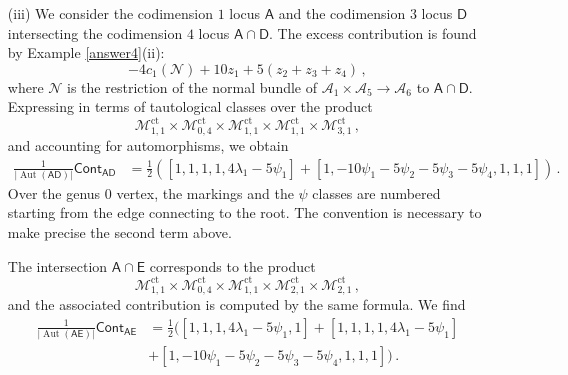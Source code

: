 \documentclass[11pt]{amsart}
\theoremstyle{definition}
\newcommand{\M}{\mathcal{M}}
\newcommand{\A}{\mathcal{A}}
\DeclareMathOperator{\ct}{ct}
\DeclareMathOperator{\Aut}{Aut}
\begin{document}
{\begin{itemize}
The contribution of the intersection $\mathsf A\cap \mathsf C$ corresponding to the locus $$\M_{1, 1}^{\ct}\times \M_{0, 3}^{\ct}\times \M_{2,1}^{\ct}\times \M^{\ct}_{3,1}$$ is found using the same method. We obtain 
\begin{align*}
\frac{1}{|\mathrm{Aut} (\mathsf{AC})|}\mathsf{Cont}_{\mathsf{AC}}&=[1,1,1,-3\lambda_2+4\lambda_1\psi_1-5\psi_1^2]+[1,1,4\lambda_1\psi_1-5\psi_1^2,1]\\&+[1,1,-3\lambda_1+4\psi_1,\lambda_1]+[1,1,4\lambda_1-5\psi_1,\psi_1] \,.\end{align*}
\item [(iii)] We consider the codimension $1$ locus $\mathsf A$ and the codimension $3$ locus $\mathsf D$ intersecting the codimension $4$ locus $\mathsf A\cap \mathsf D.$ The excess contribution is found by Example \ref{answer4}(ii): 
$$-4c_1(\mathcal N)+10 z_1+ 5(z_2+z_3+z_4)\,,$$
where $\mathcal N$ is the restriction of the normal bundle of $\A_1\times \A_5\to \A_6$ to $\mathsf A\cap \mathsf D.$ Expressing in terms of tautological classes over the product $$\M_{1,1}^{\ct}\times \M_{0, 4}^{\ct}\times \M_{1, 1}^{\ct}\times \M_{1, 1}^{\ct}\times \M_{3, 1}^{\ct}\,,$$
and accounting for automorphisms, we obtain 
\begin{align*}
\frac{1}{|\Aut(\mathsf{AD})|}\mathsf{Cont}_{\mathsf{AD}}&=\frac{1}{2}([1,1,1,1,4\lambda_1-5\psi_1]+[1,-10\psi_1-5\psi_2-5\psi_3-5\psi_4,1,1,1])\,.
\end{align*} Over the genus $0$ vertex, the markings and the $\psi$ classes are numbered starting from the edge connecting to the root. The convention is necessary to make precise the second term above. 

The intersection $\mathsf A\cap \mathsf E$ corresponds to the product 
$$\M_{1,1}^{\ct}\times \M_{0, 4}^{\ct}\times \M_{1, 1}^{\ct}\times \M_{2, 1}^{\ct}\times \M_{2, 1}^{\ct}\,,$$
and the associated contribution is computed by the same formula. We find 
\begin{align*}
\frac{1}{|\Aut(\mathsf{AE})|}\mathsf{Cont}_{\mathsf{AE}}&=\frac{1}{2}([1,1,1,4\lambda_1-5\psi_1,1]+[1,1,1,1,4\lambda_1-5\psi_1]\\&+[1,-10\psi_1-5\psi_2-5\psi_3-5\psi_4,1,1,1])\,.
\end{align*}


\end{itemize}}
\end{document}
